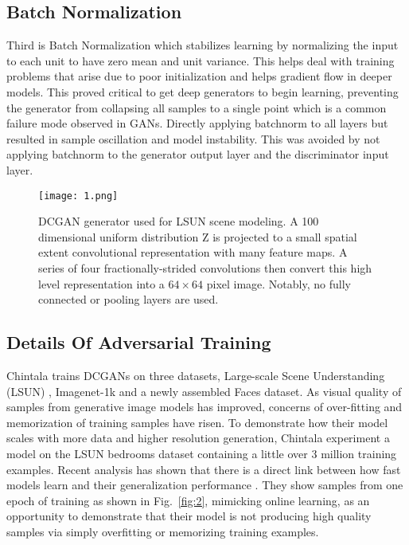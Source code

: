 \documentclass[10pt,twocolumn,letterpaper]{article}
\begin{document}
\subsection{Batch Normalization}

Third is Batch Normalization \cite{Ioffe2015Batch} which stabilizes learning by normalizing the input to each unit to have zero mean and unit variance. This helps deal with training problems that arise due to poor initialization and helps gradient flow in deeper models. This proved critical to get deep generators to begin learning, preventing the generator from collapsing all samples to a single point which is a common failure mode observed in GANs. Directly applying batchnorm to all layers but resulted in sample oscillation and model instability. This was avoided by not applying batchnorm to the generator output layer and the discriminator input layer.

\begin{figure*}
	\begin{center}
		\texttt{[image: 1.png]}
	\end{center}
	\caption{DCGAN generator used for LSUN scene modeling. A 100 dimensional uniform distribution Z is projected to a small spatial extent convolutional representation with many feature maps. A series of four fractionally-strided convolutions then convert this high level representation into a $64\times 64$ pixel image. Notably, no fully connected or pooling layers are used.}
	\label{fig:1}
\end{figure*}

\subsection{Details Of Adversarial Training}

Chintala trains DCGANs on three datasets, Large-scale Scene Understanding (LSUN) \cite{Yu2015LSUN}, Imagenet-1k and a newly assembled Faces dataset. As visual quality of samples from generative image models has improved, concerns of over-fitting and memorization of training samples have risen. To demonstrate how their model scales with more data and higher resolution generation, Chintala experiment a model on the LSUN bedrooms dataset containing a little over 3 million training examples. Recent analysis has shown that there is a direct link between how fast models learn and their generalization performance \cite{Hardt2015Train}. They show samples from one epoch of training as shown in Fig.~\ref{fig:2}, mimicking online learning, as an opportunity to demonstrate that their model is not producing high quality samples via simply overfitting or memorizing training examples.
\end{document}
